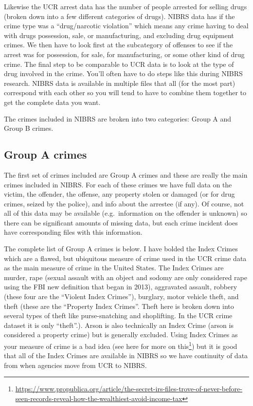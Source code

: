 \documentclass[
]{krantz}
\renewcommand{\href}[2]{#2\footnote{\url{#1}}}
\begin{document}
Likewise the UCR arrest data has the number of people
arrested for selling drugs (broken down into a few different
categories of drugs). NIBRS data has if the crime type was a
``drug/narcotic violation'' which means any crime having to
deal with drugs possession, sale, or manufacturing, and
excluding drug equipment crimes. We then have to look first
at the subcategory of offenses to see if the arrest was for
possession, for sale, for manufacturing, or some other kind
of drug crime. The final step to be comparable to UCR data
is to look at the type of drug involved in the crime. You'll
often have to do steps like this during NIBRS research.
NIBRS data is available in multiple files that all (for the
most part) correspond with each other so you will tend to
have to combine them together to get the complete data you
want.

The crimes included in NIBRS are broken into two categories:
Group A and Group B crimes.

\subsection{Group A crimes}\label{group-a-crimes}

The first set of crimes included are Group A crimes and
these are really the main crimes included in NIBRS. For each
of these crimes we have full data on the victim, the
offender, the offense, any property stolen or damaged (or
for drug crimes, seized by the police), and info about the
arrestee (if any). Of course, not all of this data may be
available (e.g.~information on the offender is unknown) so
there can be significant amounts of missing data, but each
crime incident does have corresponding files with this
information.

The complete list of Group A crimes is below. I have bolded
the Index Crimes which are a flawed, but ubiquitous measure
of crime used in the UCR crime data as the main measure of
crime in the United States. The Index Crimes are murder,
rape (sexual assault with an object and sodomy are only
considered rape using the FBI new definition that began in
2013), aggravated assault, robbery (these four are the
``Violent Index Crimes''), burglary, motor vehicle theft,
and theft (these are the ``Property Index Crimes''. Theft
here is broken down into several types of theft like
purse-snatching and shoplifting. In the UCR crime dataset it
is only ``theft''.). Arson is also technically an Index
Crime (arson is considered a property crime) but is
generally excluded. Using Index Crimes as your measure of
crime is a bad idea (see
\href{https://www.propublica.org/article/the-secret-irs-files-trove-of-never-before-seen-records-reveal-how-the-wealthiest-avoid-income-tax}{here
for more on this}) but it is good that all of the Index
Crimes are available in NIBRS so we have continuity of data
from when agencies move from UCR to NIBRS.
\end{document}
